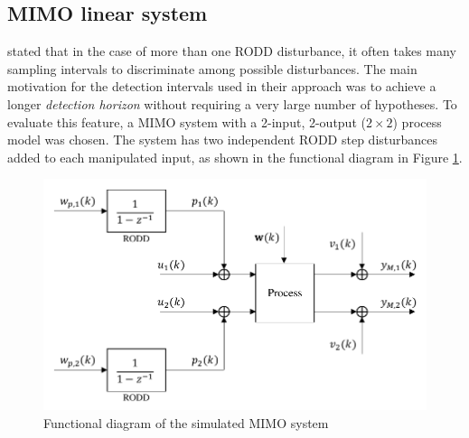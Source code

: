 \subsection{MIMO linear system} \label{sec:sim-obs-lin-2}

\cite{robertson_method_1998} stated that in the case of more than one \gls{RODD} disturbance, it often takes many sampling intervals to discriminate among possible disturbances. The main motivation for the detection intervals used in their approach was to achieve a longer \textit{detection horizon} without requiring a very large number of hypotheses. To evaluate this feature, a \gls{MIMO} system with a 2-input, 2-output ($2\times2$) process model was chosen. The system has two independent \gls{RODD} step disturbances added to each manipulated input, as shown in the functional diagram in Figure \ref{fig:sim-sys-diag-2x2}. 
\begin{figure}[htp]
	\centering
	\includegraphics[width=11.5cm]{images/sim-sys-diag-2x2.pdf}
	\caption{Functional diagram of the simulated MIMO system}
	\label{fig:sim-sys-diag-2x2}
\end{figure}

